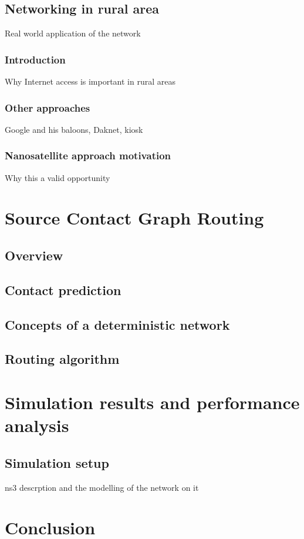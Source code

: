 \documentclass[a4paper]{article}
\begin{document}
	
		
		\subsection{Networking in rural area}
			{\sc Real world application of the network }
			\subsubsection{Introduction}
			{\sc Why Internet access is important in rural areas}
			\subsubsection{Other approaches}
			{\sc Google and his baloons, Daknet, kiosk}
			\subsubsection{Nanosatellite approach motivation}
			{\sc Why this a valid opportunity}
		
		
	\section{Source Contact Graph Routing}
	
		\subsection{Overview}
		
		\subsection{Contact prediction}
		
		\subsection{Concepts of a deterministic network}
		
		\subsection{Routing algorithm}
		
	\section{Simulation results and performance analysis}
		
			\subsection{Simulation setup}
			ns3 descrption and the modelling of the network on it
	
	\section{Conclusion}
	
\end{document}
